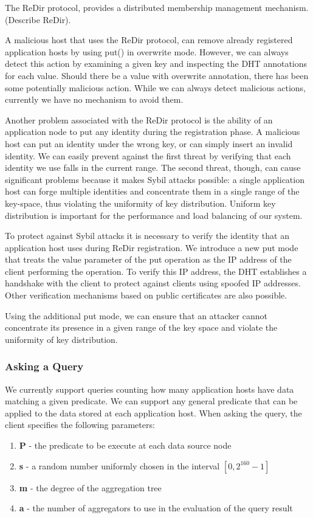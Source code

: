 \documentclass[11pt,twocolumn]{MyTightStyle}
\theoremstyle{plain}
\theoremstyle{definition}
\theoremstyle{remark}
\numberwithin{equation}{section}
\begin{document}
The ReDir protocol, provides a distributed membership management
mechanism. (Describe ReDir). 

A malicious host that uses the ReDir protocol, can remove
already registered application hosts by using put() in overwrite
mode. However, we can always detect this action by examining a given key
and inspecting the DHT annotations for each value. Should there be a
value with overwrite annotation, there has been some potentially
malicious action. While we can always detect malicious actions,
currently we have no mechanism to avoid them.

Another problem associated with the ReDir protocol is the ability of
an application node to put any identity during the registration phase. A
malicious host can put an identity under the wrong key, or can simply
insert an invalid identity. We can easily prevent against the first
threat by verifying that each identity we use falls in the current
range. The second threat, though, can cause significant problems
because it makes Sybil attacks possible: a single application host can
forge multiple identities and concentrate them in a single range of
the key-space, thus violating the uniformity of key
distribution. Uniform key distribution is important for the
performance and load balancing of our system.

To protect against Sybil attacks it is necessary to verify the
identity that an application host uses during ReDir registration. We
introduce a new put mode that treats the value parameter of the
put operation as the IP address of the client performing the
operation. To verify this IP address, the DHT establishes a handshake
with the client to protect against clients using spoofed IP
addresses. Other verification mechanisms based on public certificates
are also possible. 

Using the additional put mode, we can ensure that an attacker cannot
concentrate its presence in a given range of the key space and violate
the uniformity of key distribution. 

\subsubsection{Asking a Query}
We currently support queries counting
how many application hosts have data matching a given
predicate. We can support any general predicate that can be
applied to the data stored at each application host. When asking the
query, the client specifies the following parameters:
\begin{enumerate}
\item {\bf P} - the predicate to be execute at each data source node
\item {\bf s} - a random number uniformly chosen in the interval
  $[0,2^{160}-1]$ 
\item {\bf m} - the degree of the aggregation tree
\item {\bf a} - the number of aggregators to use in the evaluation of
  the query result
\end{enumerate}
\end{document}
